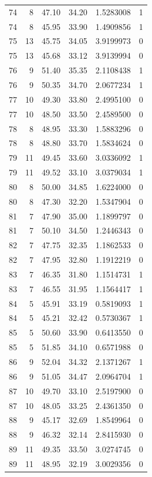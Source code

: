 \documentclass[
  letterpaper,
  DIV=11,
  numbers=noendperiod]{scrreprt}
\renewcommand{\[}{\begin{equation}}
\renewcommand{\]}{\end{equation}}
\begin{document}
\begin{table}
\begin{tabular*}{\linewidth}{@{\extracolsep{\fill}}rrrrrr}
74 & 8 & 47.10 & 34.20 & 1.5283008 & 1 \\ 
74 & 8 & 45.95 & 33.90 & 1.4909856 & 1 \\ 
75 & 13 & 45.75 & 34.05 & 3.9199973 & 0 \\ 
75 & 13 & 45.68 & 33.12 & 3.9139994 & 0 \\ 
76 & 9 & 51.40 & 35.35 & 2.1108438 & 1 \\ 
76 & 9 & 50.35 & 34.70 & 2.0677234 & 1 \\ 
77 & 10 & 49.30 & 33.80 & 2.4995100 & 0 \\ 
77 & 10 & 48.50 & 33.50 & 2.4589500 & 0 \\ 
78 & 8 & 48.95 & 33.30 & 1.5883296 & 0 \\ 
78 & 8 & 48.80 & 33.70 & 1.5834624 & 0 \\ 
79 & 11 & 49.45 & 33.60 & 3.0336092 & 1 \\ 
79 & 11 & 49.52 & 33.10 & 3.0379034 & 1 \\ 
80 & 8 & 50.00 & 34.85 & 1.6224000 & 0 \\ 
80 & 8 & 47.30 & 32.20 & 1.5347904 & 0 \\ 
81 & 7 & 47.90 & 35.00 & 1.1899797 & 0 \\ 
81 & 7 & 50.10 & 34.50 & 1.2446343 & 0 \\ 
82 & 7 & 47.75 & 32.35 & 1.1862533 & 0 \\ 
82 & 7 & 47.95 & 32.80 & 1.1912219 & 0 \\ 
83 & 7 & 46.35 & 31.80 & 1.1514731 & 1 \\ 
83 & 7 & 46.55 & 31.95 & 1.1564417 & 1 \\ 
84 & 5 & 45.91 & 33.19 & 0.5819093 & 1 \\ 
84 & 5 & 45.21 & 32.42 & 0.5730367 & 1 \\ 
85 & 5 & 50.60 & 33.90 & 0.6413550 & 0 \\ 
85 & 5 & 51.85 & 34.10 & 0.6571988 & 0 \\ 
86 & 9 & 52.04 & 34.32 & 2.1371267 & 1 \\ 
86 & 9 & 51.05 & 34.47 & 2.0964704 & 1 \\ 
87 & 10 & 49.70 & 33.10 & 2.5197900 & 0 \\ 
87 & 10 & 48.05 & 33.25 & 2.4361350 & 0 \\ 
88 & 9 & 45.17 & 32.69 & 1.8549964 & 0 \\ 
88 & 9 & 46.32 & 32.14 & 2.8415930 & 0 \\ 
89 & 11 & 49.35 & 33.50 & 3.0274745 & 0 \\ 
89 & 11 & 48.95 & 32.19 & 3.0029356 & 0 \\ 

\end{tabular*}
\end{table}
\end{document}

